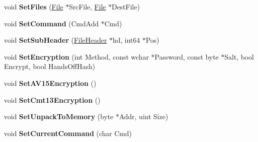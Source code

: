 \begin{DoxyCompactItemize}
\item 
\hypertarget{class_compr_data_i_o_a9c219e2c7b6c221cde925808ba91ac29}{void {\bfseries Set\-Files} (\hyperlink{class_file}{File} $\ast$Src\-File, \hyperlink{class_file}{File} $\ast$Dest\-File)}\label{class_compr_data_i_o_a9c219e2c7b6c221cde925808ba91ac29}

\item 
\hypertarget{class_compr_data_i_o_a13f1a0006a814cffc12f637e4b9cd394}{void {\bfseries Set\-Command} (Cmd\-Add $\ast$Cmd)}\label{class_compr_data_i_o_a13f1a0006a814cffc12f637e4b9cd394}

\item 
\hypertarget{class_compr_data_i_o_ac668e4ab5228552d554ae25435ef28c2}{void {\bfseries Set\-Sub\-Header} (\hyperlink{struct_file_header}{File\-Header} $\ast$hd, int64 $\ast$Pos)}\label{class_compr_data_i_o_ac668e4ab5228552d554ae25435ef28c2}

\item 
\hypertarget{class_compr_data_i_o_af81b2fa4a0b74b5048307f11f0285bb8}{void {\bfseries Set\-Encryption} (int Method, const wchar $\ast$Password, const byte $\ast$Salt, bool Encrypt, bool Hands\-Off\-Hash)}\label{class_compr_data_i_o_af81b2fa4a0b74b5048307f11f0285bb8}

\item 
\hypertarget{class_compr_data_i_o_ae778fbef5bc6d99ae3985115083e9ec2}{void {\bfseries Set\-A\-V15\-Encryption} ()}\label{class_compr_data_i_o_ae778fbef5bc6d99ae3985115083e9ec2}

\item 
\hypertarget{class_compr_data_i_o_a248f726707d75e797e53ca148ccee020}{void {\bfseries Set\-Cmt13\-Encryption} ()}\label{class_compr_data_i_o_a248f726707d75e797e53ca148ccee020}

\item 
\hypertarget{class_compr_data_i_o_ae80811c83ce1bda80692abe6fd8c3d94}{void {\bfseries Set\-Unpack\-To\-Memory} (byte $\ast$Addr, uint Size)}\label{class_compr_data_i_o_ae80811c83ce1bda80692abe6fd8c3d94}

\item 
\hypertarget{class_compr_data_i_o_a4b071da90bf0de99fa656e174192cea1}{void {\bfseries Set\-Current\-Command} (char Cmd)}\label{class_compr_data_i_o_a4b071da90bf0de99fa656e174192cea1}

\end{DoxyCompactItemize}
